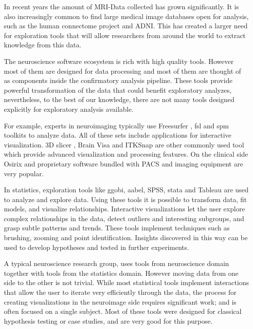 \documentclass[utf8,paper]{frontiersSCNS} %
\begin{document}
In recent years the amount of MRI-Data collected has grown significantly. It is also increasingly common to find large medical image databases open for analysis, such as the human connectome project\citep{rosen_human_2010} and ADNI\citep{jack_alzheimers_2008}. This has created a larger need for exploration tools that will allow researchers from around the world to extract knowledge from this data. 

The neuroscience software ecosystem is rich with high quality tools. However most of them are designed for data processing and most of them are thought of as components inside the confirmatory analysis pipeline. These tools provide powerful transformation of the data that could benefit exploratory analyzes, nevertheless, to the best of our knowledge, there are not many tools designed explicitly for exploratory analysis available.

For example, experts in neuroimaging typically use Freesurfer  \citep{fischl_freesurfer_2012}, fsl\citep{jenkinson_fsl_2012} and spm \citep{friston_statistical_2006} toolkits to analyze data. All of these sets include applications for interactive visualization. 3D slicer \citep{fedorov_3d_2012}, Brain Visa \citep{cointepas_brainvisa:_2001} and ITKSnap \citep{yushkevich_user-guided_2006} are other commonly used tool which provide advanced visualization and processing features. On the clinical side Osirix\citep{rosset_osirix:_2004} and proprietary software bundled with PACS and imaging equipment are very popular. 

In statistics, exploration tools like ggobi\citep{cook_interactive_2007}, aabel, SPSS, stata and Tableau\citep{hanrahan_tableau_2003} are used to analyze and explore data. Using these tools it is possible to transform data, fit models, and visualize relationships.  Interactive visualizations let the user explore complex relationships in the data, detect outliers and interesting subgroups, and grasp subtle patterns and trends. These tools implement techniques such as brushing, zooming and point identification. Insights discovered in this way can be used to develop hypotheses and tested in further experiments. 

A typical neuroscience research group, uses tools from neuroscience domain together with tools from the statistics domain. However moving data from one side to the other  is not trivial. While most statistical tools implement interactions that allow the user to iterate very efficiently through the data, the process for creating visualizations in the neuroimage side requires significant work; and is often focused on a single subject. Most of these tools were designed for classical hypothesis testing or case studies, and are very good for this purpose. 
\end{document}
